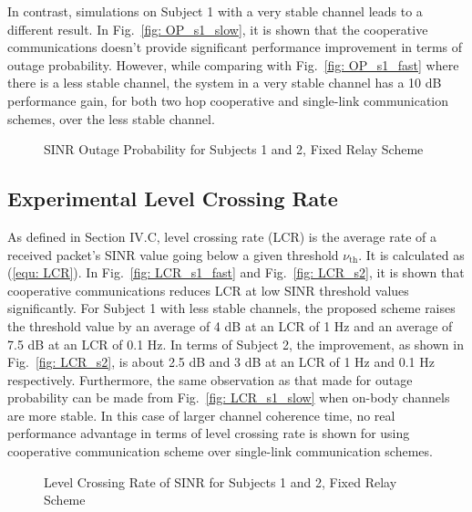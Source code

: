 \documentclass[12pt,draftcls,a4paper,onecolumn,journal]{IEEEtran}
\begin{document}
In contrast, simulations on Subject 1 with a very stable channel leads to a different result. In Fig.~\ref{fig: OP_s1_slow}, it is shown that the cooperative communications doesn't provide significant performance improvement in terms of outage probability. However, while comparing with Fig.~\ref{fig: OP_s1_fast} where there is a less stable channel, the system in a very stable channel has a 10 dB  performance gain, for both two hop cooperative and single-link communication schemes, over the less stable channel.

\begin{figure}[]
\centering
{}
\caption{SINR Outage Probability for Subjects 1 and 2, Fixed Relay Scheme}
\label{fig: outage probability}
\end{figure}


\subsection{Experimental Level Crossing Rate}
As defined in Section IV.C, level crossing rate (LCR) is the average rate of a received packet's SINR value going below a given threshold $\nu_{\mathrm{th}}$. It is calculated as (\ref{equ: LCR}). In Fig.~\ref{fig: LCR_s1_fast} and Fig.~\ref{fig: LCR_s2}, it is shown that cooperative communications reduces LCR at low SINR threshold values significantly. For Subject 1 with less stable channels, the proposed scheme raises the threshold value by an average of 4 dB at an LCR of 1 Hz and an average of 7.5 dB at an LCR of 0.1 Hz. In terms of Subject 2, the improvement, as shown in Fig.~\ref{fig: LCR_s2}, is about 2.5 dB and 3 dB at an LCR of 1 Hz and 0.1 Hz respectively. Furthermore, the same observation as that made for outage probability can be made from Fig.~\ref{fig: LCR_s1_slow} when on-body channels are more stable. In this case of larger channel coherence time, no real performance advantage in terms of level crossing rate is shown for using cooperative communication scheme over single-link communication schemes.

\begin{figure}[]
\centering
{}
\caption{Level Crossing Rate of SINR for Subjects 1 and 2,  Fixed Relay Scheme}
\label{fig: level crossing rate}
\end{figure}
\end{document}
